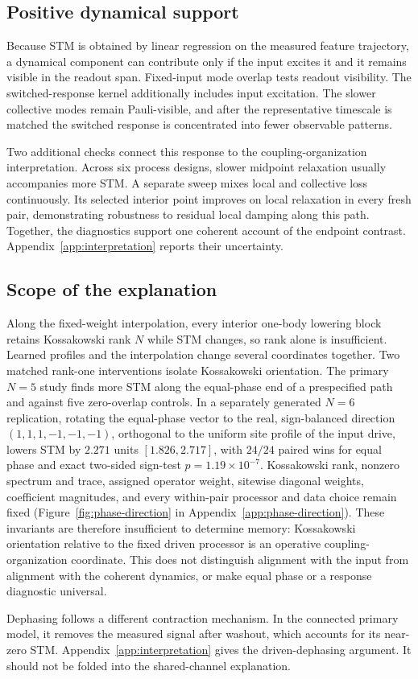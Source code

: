 \subsection{Positive dynamical support}

\RelaxationTheoryPriorWork

Because STM is obtained by linear regression on the measured feature
trajectory, a dynamical component can contribute only if the input excites it
and it remains visible in the readout span. Fixed-input mode overlap tests
readout visibility. The switched-response kernel additionally includes input
excitation. The slower collective modes remain Pauli-visible, and after the
representative timescale is matched the switched response is concentrated into
fewer observable patterns.

Two additional checks connect this response to the coupling-organization
interpretation. Across six
process designs, slower midpoint relaxation usually accompanies more STM. A
separate sweep mixes local and collective loss continuously. Its selected
interior point improves on local relaxation in every fresh pair, demonstrating
robustness to residual local damping along this path. Together, the diagnostics
support one coherent account of the endpoint contrast.
Appendix~\ref{app:interpretation} reports their uncertainty.

\subsection{Scope of the explanation}

Along the fixed-weight interpolation, every interior one-body lowering block
retains Kossakowski rank \(N\) while STM changes, so rank alone is insufficient.
Learned profiles and the interpolation change several coordinates together.
Two matched rank-one interventions isolate Kossakowski orientation. The
primary \(N=5\) study finds more STM along the equal-phase end of a
prespecified path and against five zero-overlap controls. In a separately
generated \(N=6\) replication, rotating the equal-phase vector to the real,
sign-balanced direction \((1,1,1,-1,-1,-1)\), orthogonal to the uniform
site profile of the input drive, lowers STM by \(2.271\) units
\([1.826,2.717]\), with
\(24/24\) paired wins for equal phase and exact two-sided sign-test
\(p=1.19\times10^{-7}\). Kossakowski rank, nonzero spectrum and trace,
assigned operator weight, sitewise diagonal weights, coefficient magnitudes,
and every within-pair processor and data choice remain fixed
(Figure~\ref{fig:phase-direction} in Appendix~\ref{app:phase-direction}).
These invariants are
therefore insufficient to determine memory: Kossakowski orientation relative
to the fixed driven processor is an operative coupling-organization
coordinate. This
does not distinguish alignment with the input from alignment with the
coherent dynamics, or make equal phase or a response diagnostic universal.

Dephasing follows a different contraction mechanism. In the connected primary
model, it removes the measured signal after washout, which accounts for its
near-zero STM. Appendix~\ref{app:interpretation} gives the driven-dephasing
argument. It should not be folded into the shared-channel explanation.
